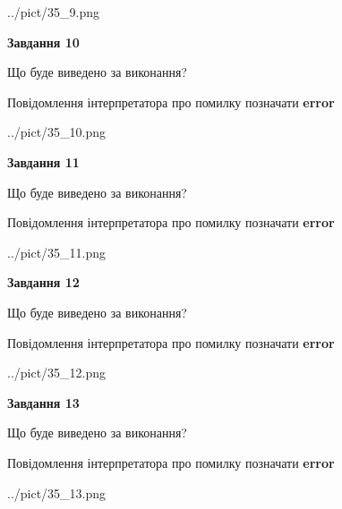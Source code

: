 \documentclass[11pt, ukrainian]{article}
\begin{document}
{\begin {large}
\begin{center}
	{../pict/35_9.png}
\end{center}
\newpage

{\begin {center}\textbf{Завдання 10}\end {center}}\par
Що буде виведено за виконання? \par
Повідомлення інтерпретатора про помилку позначати \textbf{error}

\begin{center}
	{../pict/35_10.png}
\end{center}
\newpage

{\begin {center}\textbf{Завдання 11}\end {center}}\par
Що буде виведено за виконання? \par
Повідомлення інтерпретатора про помилку позначати \textbf{error}

\begin{center}
	{../pict/35_11.png}
\end{center}
\newpage

{\begin {center}\textbf{Завдання 12}\end {center}}\par
Що буде виведено за виконання? \par
Повідомлення інтерпретатора про помилку позначати \textbf{error}

\begin{center}
	{../pict/35_12.png}
\end{center}
\newpage

{\begin {center}\textbf{Завдання 13}\end {center}}\par
Що буде виведено за виконання? \par
Повідомлення інтерпретатора про помилку позначати \textbf{error}

\begin{center}
	{../pict/35_13.png}
\end{center}
\newpage


\end{large}}
\end{document}
